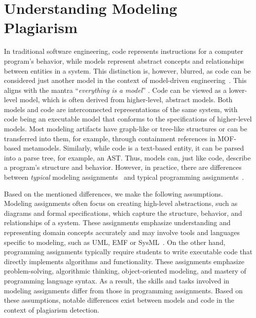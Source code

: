 \section{Understanding Modeling Plagiarism}\label{sec:mde-considerations}

\noindent
In traditional software engineering, code represents instructions for a computer program's behavior, while models represent abstract concepts and relationships between entities in a system.
This distinction is, however, blurred, as code can be considered just another model in the context of model-driven engineering~\cite{Stachowiak1973}. This aligns with the mantra \enquote{\textit{everything is a model}} \cite{Bezevin2005}. Code can be viewed as a lower-level model, which is often derived from higher-level, abstract models. Both models and code are interconnected representations of the same system, with code being an executable model that conforms to the specifications of higher-level models.
Most modeling artifacts have graph-like or tree-like structures or can be transferred into them, for example, through containment references in \ac{MOF}-based metamodels.
Similarly, while code is a text-based entity, it can be parsed into a parse tree, for example, an \ac{AST}.
Thus, models can, just like code, describe a program's structure and behavior. However, in practice, there are differences between \textit{typical} modeling assignments~\cite{Ciccozzi2018} and typical programming assignments~\cite{Schulte2006}.

Based on the mentioned differences, we make the following assumptions.
Modeling assignments often focus on creating high-level abstractions, such as diagrams and formal specifications, which capture the structure, behavior, and relationships of a system. These assignments emphasize understanding and representing domain concepts accurately and may involve tools and languages specific to modeling, such as \ac{UML}, \ac{EMF} or \ac{SysML}~\cite{Kienzle2024}. On the other hand, programming assignments typically require students to write executable code that directly implements algorithms and functionality. These assignments emphasize problem-solving, algorithmic thinking, object-oriented modeling, and mastery of programming language syntax.
As a result, the skills and tasks involved in modeling assignments differ from those in programming assignments. 
Based on these assumptions, notable differences exist between models and code in the context of plagiarism detection.

